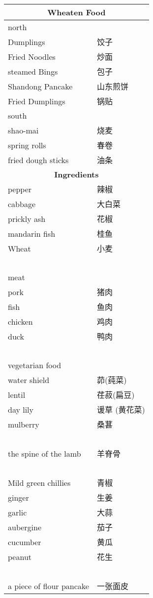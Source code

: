 \begin{longtable}{|p{7cm}|p{7cm}|}
    \multicolumn{2}{c}{\textbf{Wheaten Food}} \\ \hline
    north & ~ \\ \hline
    Dumplings & 饺子 \\ \hline
    Fried Noodles & 炒面 \\ \hline
    steamed Bings & 包子 \\ \hline
    Shandong Pancake & 山东煎饼 \\ \hline
    Fried Dumplings & 锅贴 \\ \hline
    south & ~ \\ \hline
    shao-mai & 烧麦 \\ \hline
    spring rolls & 春卷 \\ \hline
    fried dough sticks & 油条 \\ \hline
    
    \multicolumn{2}{c}{\textbf{Ingredients}} \\ \hline
    pepper & 辣椒 \\ \hline
    cabbage & 大白菜 \\ \hline
    prickly ash & 花椒 \\ \hline
    mandarin fish & 桂鱼 \\ \hline
    Wheat & 小麦 \\ \hline
    ~ & ~ \\ \hline
    meat & ~ \\ \hline
    pork & 猪肉 \\ \hline
    fish & 鱼肉 \\ \hline
    chicken & 鸡肉 \\ \hline
    duck & 鸭肉 \\ \hline
    ~ & ~ \\ \hline
    vegetarian food & ~ \\ \hline
    water shield & 茆(莼菜) \\ \hline
    lentil & 荏菽(扁豆) \\ \hline
    day lily & 谖草 (黄花菜) \\ \hline
    mulberry & 桑葚 \\ \hline
    ~ & ~ \\ \hline
    the spine of the lamb & 羊脊骨 \\ \hline
    ~ & ~ \\ \hline
    Mild green chillies & 青椒 \\ \hline
    ginger & 生姜 \\ \hline
    garlic & 大蒜 \\ \hline
    aubergine & 茄子 \\ \hline
    cucumber & 黄瓜 \\ \hline
    peanut & 花生 \\ \hline
    ~ & ~ \\ \hline
    a piece of flour pancake & 一张面皮 \\ \hline
    

\end{longtable}
